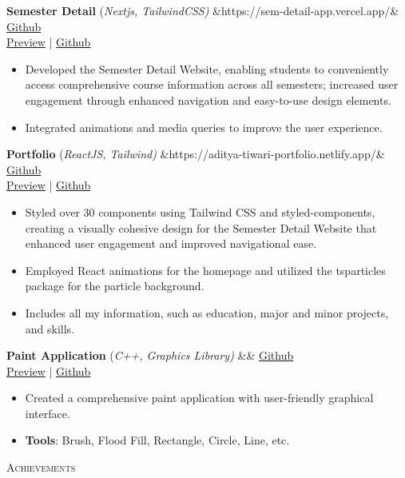 \documentclass[10pt]{article}
\newcommand{\tinyBulletSep} { \vspace{1.2mm} }
\newcommand{\bulletSep} { \vspace{2.2mm} }
\newcommand{\sectionSep} { \vspace{3mm} }
\newcommand{\lineunder} {
    \vspace*{-8pt} \\
    \hspace*{-15pt} \hrulefill \\
}
\newcommand{\header} [1] {
    {\hspace*{-18pt}\vspace*{6pt} {
        \fontfamily{qcs}\selectfont \large \scshape #1
    }}
    \vspace*{-6pt} \lineunder
    \vspace{0.5mm}
}
\newcommand{\projectItem}[5]{
    {\textbf{#1}} {(\sl #2)}\hfill
    \ifx&#3&%
    \href{#4}{Github}\\
    \else
    \href{#3}{Preview} | \href{#4}{Github}\\
    \fi
    \begin{itemize}
        #5
    \end{itemize}
}
\begin{document}
\projectItem{Semester Detail}{Nextjs, TailwindCSS}{https://sem-detail-app.vercel.app/}{https://github.com/devloper016/Semester-Detail-Website}{
    \item Developed the Semester Detail Website, enabling students to conveniently access comprehensive course information across all semesters; increased user engagement through enhanced navigation and easy-to-use design elements.

    \item Integrated animations and media queries to improve the user experience.
}\bulletSep

\projectItem{Portfolio}{ReactJS, Tailwind}{https://aditya-tiwari-portfolio.netlify.app/}{https://github.com/devloper016/Portfolio}{
    \item Styled over 30 components using Tailwind CSS and styled-components, creating a visually cohesive design for the Semester Detail Website that enhanced user engagement and improved navigational ease.
    \item  Employed React animations for the homepage and utilized the tsparticles package for the particle background.
    \item Includes all my information, such as education, major and minor projects, and skills.
}
\bulletSep

\projectItem{Paint Application}{C++, Graphics Library}{}{https://github.com/devloper016/paint/tree/main}{
    \item Created a comprehensive paint application with {user-friendly graphical interface}.
    \item \textbf{Tools}: Brush, Flood Fill, Rectangle, Circle, Line, etc.
}
\bulletSep

\sectionSep

\header{Achievements}
\end{document}
